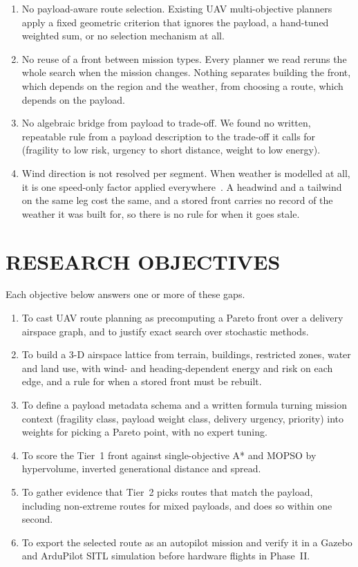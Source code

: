 \begin{enumerate}
  \item[\textbf{Gap 1.}] No payload-aware route selection. Existing UAV
  multi-objective planners apply a fixed geometric criterion that ignores the payload,
  a hand-tuned weighted sum, or no selection mechanism at all.
  \item[\textbf{Gap 2.}] No reuse of a front between mission types. Every planner
  we read reruns the whole search when the mission changes. Nothing
  separates building the front, which depends on the region and the weather, from
  choosing a route, which depends on the payload.
  \item[\textbf{Gap 3.}] No algebraic bridge from payload to trade-off. We found
  no written, repeatable rule from a payload description to the trade-off it calls for
  (fragility to low risk, urgency to short distance, weight to low energy).
  \item[\textbf{Gap 4.}] Wind direction is not resolved per segment. When
  weather is modelled at all, it is one speed-only factor applied everywhere~\cite{r1}. A
  headwind and a tailwind on the same leg cost the same, and a stored front carries no
  record of the weather it was built for, so there is no rule for when it goes stale.
\end{enumerate}

\section{RESEARCH OBJECTIVES}\label{sec:objectives}

Each objective below answers one or more of these gaps.

\begin{enumerate}
  \item To cast UAV route planning as precomputing a Pareto front over a delivery
  airspace graph, and to justify exact search over stochastic methods.
  \item To build a 3-D airspace lattice from terrain, buildings, restricted zones, water
  and land use, with wind- and heading-dependent energy and risk on each edge, and a rule
  for when a stored front must be rebuilt.
  \item To define a payload metadata schema and a written formula turning mission
  context (fragility class, payload weight class, delivery urgency, priority) into
  weights for picking a Pareto point, with no expert tuning.
  \item To score the Tier~1 front against single-objective A* and MOPSO by
  hypervolume, inverted generational distance and spread.
  \item To gather evidence that Tier~2 picks routes that match the payload, including
  non-extreme routes for mixed payloads, and does so within one second.
  \item To export the selected route as an autopilot mission and verify it in a Gazebo
  and ArduPilot SITL simulation before hardware flights in Phase~II.
\end{enumerate}

